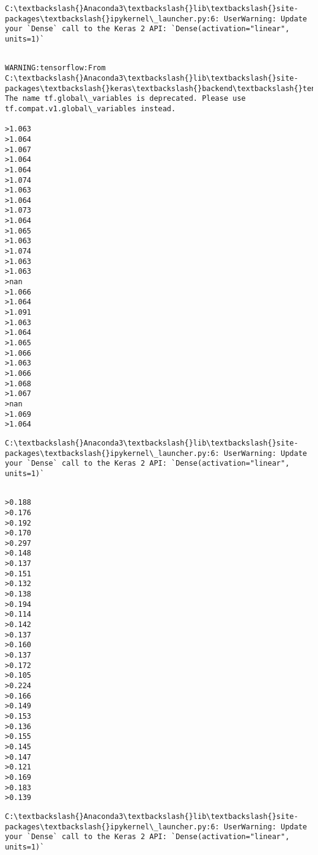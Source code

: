 \documentclass[11pt]{article}
\begin{document}
    \begin{Verbatim}[commandchars=\\\{\}]
C:\textbackslash{}Anaconda3\textbackslash{}lib\textbackslash{}site-packages\textbackslash{}ipykernel\_launcher.py:6: UserWarning: Update your `Dense` call to the Keras 2 API: `Dense(activation="linear", units=1)`
  

    \end{Verbatim}

    \begin{Verbatim}[commandchars=\\\{\}]
WARNING:tensorflow:From C:\textbackslash{}Anaconda3\textbackslash{}lib\textbackslash{}site-packages\textbackslash{}keras\textbackslash{}backend\textbackslash{}tensorflow\_backend.py:422: The name tf.global\_variables is deprecated. Please use tf.compat.v1.global\_variables instead.

>1.063
>1.064
>1.067
>1.064
>1.064
>1.074
>1.063
>1.064
>1.073
>1.064
>1.065
>1.063
>1.074
>1.063
>1.063
>nan
>1.066
>1.064
>1.091
>1.063
>1.064
>1.065
>1.066
>1.063
>1.066
>1.068
>1.067
>nan
>1.069
>1.064

    \end{Verbatim}

    \begin{Verbatim}[commandchars=\\\{\}]
C:\textbackslash{}Anaconda3\textbackslash{}lib\textbackslash{}site-packages\textbackslash{}ipykernel\_launcher.py:6: UserWarning: Update your `Dense` call to the Keras 2 API: `Dense(activation="linear", units=1)`
  

    \end{Verbatim}

    \begin{Verbatim}[commandchars=\\\{\}]
>0.188
>0.176
>0.192
>0.170
>0.297
>0.148
>0.137
>0.151
>0.132
>0.138
>0.194
>0.114
>0.142
>0.137
>0.160
>0.137
>0.172
>0.105
>0.224
>0.166
>0.149
>0.153
>0.136
>0.155
>0.145
>0.147
>0.121
>0.169
>0.183
>0.139

    \end{Verbatim}

    \begin{Verbatim}[commandchars=\\\{\}]
C:\textbackslash{}Anaconda3\textbackslash{}lib\textbackslash{}site-packages\textbackslash{}ipykernel\_launcher.py:6: UserWarning: Update your `Dense` call to the Keras 2 API: `Dense(activation="linear", units=1)`
  

    \end{Verbatim}
\end{document}

